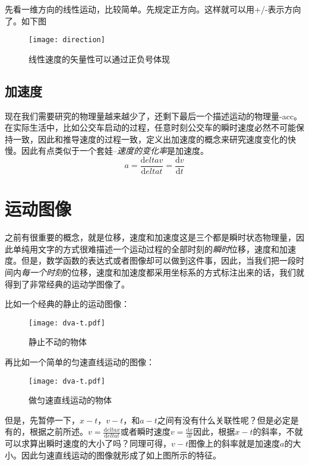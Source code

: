先看一维方向的线性运动，比较简单。先规定\textcolor{r1}{正方向}。这样就可以用+/-表示方向了。如下图
\begin{figure}[H]
	\centering
	\texttt{[image: direction]}
	\caption{线性速度的矢量性可以通过正负号体现}
\end{figure}


\subsection*{加速度}
\label{subsec:Acceleration}
现在我们需要研究的物理量越来越少了，还剩下最后一个描述运动的物理量-\gls{acc}。在实际生活中，比如公交车启动的过程，任意时刻公交车的瞬时速度必然不可能保持一致，因此和推导速度的过程一致，定义出加速度的概念来研究速度变化的快慢。因此有点类似于一个套娃--\emph{速度的变化率}是加速度。
\[
	a= \frac{\mathrm{d}elta v}{\mathrm{d}elta t} =\frac{\mathrm{d} v}{\mathrm{d} t}
\]


\clearpage


\section{运动图像}
\label{sec:Graphs of motion}
之前有很重要的概念，就是位移，速度和加速度这是三个都是瞬时状态物理量，因此单纯用文字的方式很难描述一个运动过程的全部时刻的\emph{瞬时}位移，速度和加速度。但是，数学函数的表达式或者图像却可以做到这件事，因此，当我们把一段时间内\emph{每一个时刻}的位移，速度和加速度都采用坐标系的方式标注出来的话，我们就得到了非常经典的运动学图像了。

比如一个经典的静止的运动图像：

\begin{figure}[H] %
\texttt{[image: dva-t.pdf]}
\caption{静止不动的物体}
\end{figure}

再比如一个简单的匀速直线运动的图像：

\begin{figure}[H]  %
\texttt{[image: dva-t.pdf]}
\caption{做匀速直线运动的物体}
\end{figure}

但是，先暂停一下，$x-t$，$v-t$，和$a-t$之间有没有什么关联性呢？但是必定是有的，根据之前所述。$v=\frac{\mathrm{d}elta x}{\mathrm{d}elta t}$或者瞬时速度$v=\frac{\mathrm{d} x}{\mathrm{d} t}$因此，根据$x-t$的斜率，不就可以求算出瞬时速度的大小了吗？同理可得，$v-t$图像上的斜率就是加速度$a$的大小。因此匀速直线运动的图像就形成了如上图所示的特征。

